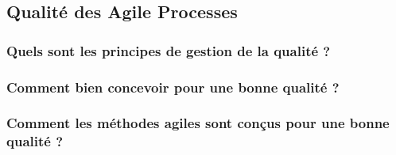 \subsection{Qualité des Agile Processes}



\subsubsection{Quels sont les principes de gestion de la qualité ?}



\subsubsection{Comment bien concevoir pour une bonne qualité ?}



\subsubsection{Comment les méthodes agiles sont conçus pour une bonne qualité ?}